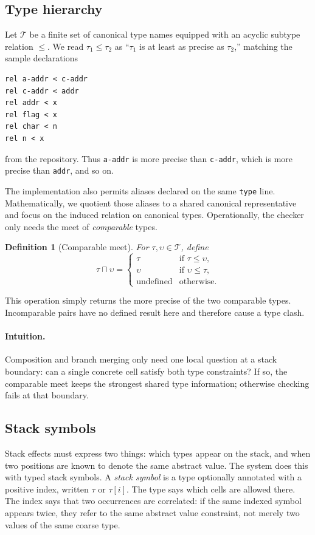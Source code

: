 \documentclass[acmsmall,screen,review,anonymous,nonacm]{acmart}
\newtheorem{definition}{Definition}
\newcommand{\Types}{\mathcal{T}}
\newcommand{\glb}{\mathbin{\sqcap}}
\begin{document}
\subsection{Type hierarchy}
Let $\Types$ be a finite set of canonical type names equipped with an acyclic subtype
relation $\leq$. We read $\tau_1 \leq \tau_2$ as ``$\tau_1$ is at least as precise as
$\tau_2$,'' matching the sample declarations
\begin{lstlisting}
rel a-addr < c-addr
rel c-addr < addr
rel addr < x
rel flag < x
rel char < n
rel n < x
\end{lstlisting}
from the repository. Thus \texttt{a-addr} is more precise than \texttt{c-addr}, which is more precise than \texttt{addr}, and so on.

The implementation also permits aliases declared on the same \texttt{type} line.
Mathematically, we quotient those aliases to a shared canonical representative and focus
on the induced relation on canonical types. Operationally, the checker only needs the
meet of \emph{comparable} types.

\begin{definition}[Comparable meet]
For $\tau,\upsilon \in \Types$, define
\[
\tau \glb \upsilon =
\begin{cases}
\tau & \text{if } \tau \leq \upsilon,\\
\upsilon & \text{if } \upsilon \leq \tau,\\
\text{undefined} & \text{otherwise.}
\end{cases}
\]
\end{definition}

This operation simply returns the more precise of the two comparable types. Incomparable
pairs have no defined result here and therefore cause a type clash.

\paragraph{Intuition.}
Composition and branch merging only need one local question at a stack boundary: can a
single concrete cell satisfy both type constraints? If so, the comparable meet keeps the
strongest shared type information; otherwise checking fails at that boundary.

\subsection{Stack symbols}
Stack effects must express two things: which types appear on the stack, and when two
positions are known to denote the same abstract value. The system does this with typed
stack symbols. A \emph{stack symbol} is a type optionally annotated with a positive
index, written $\tau$ or $\tau[i]$. The type says which cells are allowed there. The
index says that two occurrences are correlated: if the same indexed symbol appears twice,
they refer to the same abstract value constraint, not merely two values of the same
coarse type.
\end{document}
